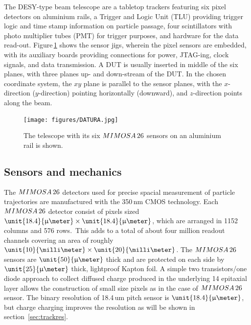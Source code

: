 
The DESY-type beam telescope are a tabletop trackers featuring six pixel detectors on aluminium rails, a Trigger and Logic Unit (TLU) providing trigger logic and time stamp information on particle passage,
 four scintillators with photo multiplier tubes (PMT) for trigger purposes, and hardware for the data read-out. 
Figure\,\ref{fig:datura-tscope} shows the sensor jigs, wherein the pixel sensors are embedded, with its auxiliary boards providing connections for power, JTAG-ing, clock signals, and data transmission.
A DUT is usually inserted in middle of the six planes, with three planes up- and down-stream of the DUT. 
In the chosen coordinate system, the $xy$ plane is parallel to the sensor planes, with the $x$-direction ($y$-direction) pointing horizontally (downward), and $z$-direction points along the beam. 

\begin{figure}[tb]
	\center
	\texttt{[image: figures/DATURA.jpg]}
	\caption[The \Datura telescope]{The \Datura telescope with its six $MIMOSA\,26$ sensors on an aluminium rail is shown.}
	\label{fig:datura-tscope}
\end{figure}
 
\subsection{Sensors and mechanics}

The $MIMOSA\,26$ detectors used for precise spacial measurement of particle trajectories are manufactured with the 350\,nm CMOS technology. 
Each $MIMOSA\,26$ detector consist of pixels sized $\unit{18.4}{\upmu\meter} \times \unit{18.4}{\upmu\meter}$, which are arranged in 1152 columns and 576 rows.\,\cite{HuGuo2010480}
This adds to a total of about four million readout channels covering an area of roughly $\unit{10}{\milli\meter} \times \unit{20}{\milli\meter}$. 
The $MIMOSA\,26$ sensors are $\unit{50}{\upmu\meter}$ thick and are protected on each side by $\unit{25}{\upmu\meter}$ thick, lightproof Kapton foil. 
A simple two transistors/one diode approach to collect diffused charge produced in the underlying \unit{14}{\upmu\meter} epitaxial layer
 allows the construction of small size pixels as in the case of $MIMOSA\,26$ sensor.
The binary resolution of 18.4\,um pitch sensor is $\unit{18.4}{\upmu\meter}$, but charge charging improves the resolution as will be shown in section~\ref{sec:trackres}.


